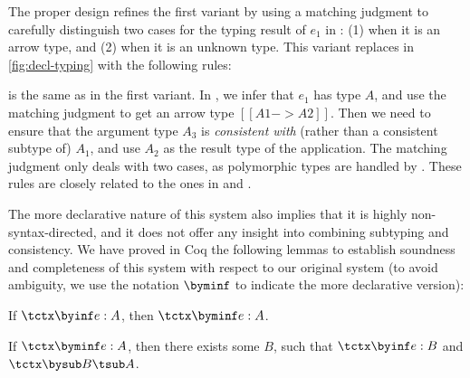 The proper design refines the first variant by using a matching judgment to
carefully distinguish two cases for the typing result of $e_1$ in :
(1) when it is an arrow type, and (2) when it is an unknown type. This
variant replaces  in \cref{fig:decl-typing} with the following
rules:
 is the same as in the first variant. In , we infer
that $e_1$ has type $A$, and use the matching judgment to get an arrow type $[[A1 ->
A2]]$. Then we need to ensure that the argument type $A_3$ is \emph{consistent
  with} (rather than a consistent subtype of) $A_1$, and use $A_2$ as the
result type of the application. The matching judgment only deals with two cases,
as polymorphic types are handled by . These rules are closely related
to the ones in \citet{siek2006gradual} and \citet{siek2007gradual}.

The more declarative nature of this system also implies that it is highly non-syntax-directed, 
and it does not offer any insight into combining subtyping and
consistency. We have proved in Coq the following lemmas to establish soundness
and completeness of this system with respect to our original system (to avoid
ambiguity, we use the notation $\byminf$ to indicate the more declarative
version):

\begin{clemma}
  If $\tctx \byinf e : A$, then $\tctx \byminf e : A$.
\end{clemma}

\begin{clemma}
  If $\tctx \byminf e : A$, then there exists some $B$, such that $\tctx \byinf e : B$ and $\tctx \bysub B \tsub A$.
\end{clemma}


